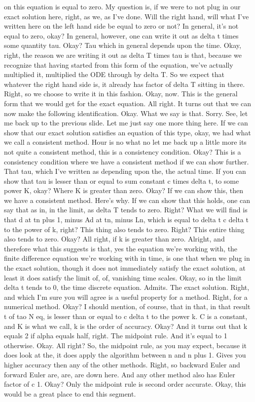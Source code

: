 \documentclass[10pt]{article}
\begin{document}
on this equation is equal to zero. My question is, if we were to not plug in our exact solution here, right, as we, as I've done. Will the right hand, will what I've written here on the left hand side be equal to zero or not? In general, it's not equal to zero, okay? In general, however, one can write it out as delta t times some quantity tau. Okay? Tau which in general depends upon the time. Okay, right, the reason we are writing it out as delta T times tau is that, because we recognize that having started from this form of the equation, we've actually multiplied it, multiplied the ODE through by delta T. So we expect that whatever the right hand side is, it already has factor of delta T sitting in there. Right, so we choose to write it in this fashion. Okay, now. This is the general form that we would get for the exact equation. All right. It turns out that we can now make the following identification. Okay. What we say is that. Sorry. See, let me back up to the previous slide. Let me just say one more thing here. If we can show that our exact solution satisfies an equation of this type, okay, we had what we call a consistent method. Hour is no what no let me back up a little more its not quite a consistent method, this is a consistency condition. Okay? This is a consistency condition where we have a consistent method if we can show further. That tau, which I've written as depending upon the, the actual time. If you can show that tau is lesser than or equal to sum constant c times delta t, to some power K, okay? Where K is greater than zero. Okay? If we can show this, then we have a consistent method. Here's why. If we can show that this holds, one can say that as in, in the limit, as delta T tends to zero. Right? What we will find is that d at tn plus 1, minus Ad at tn, minus Ln, which is equal to delta t c delta t to the power of k, right? This thing also tends to zero. Right? This entire thing also tends to zero. Okay? All right, if k is greater than zero. Alright, and therefore what this suggests is that, yes the equation we're working with, the finite difference equation we're working with in time, is one that when we plug in the exact solution, though it does not immediately satisfy the exact solution, at least it does satisfy the limit of, of, vanishing time scales. Okay, so in the limit delta t tends to 0, the time discrete equation. Admits. The exact solution. Right, and which I'm sure you will agree is a useful property for a method. Right, for a numerical method. Okay? I should mention, of course, that in that, in that result t of tao N eq, is lesser than or equal to c delta t to the power k. C is a constant, and K is what we call, k is the order of accuracy. Okay? And it turns out that k equals 2 if alpha equals half, right. The midpoint rule. And it's equal to 1 otherwise. Okay. All right? So, the midpoint rule, as you may expect, because it does look at the, it does apply the algorithm between n and n plus 1. Gives you higher accuracy then any of the other methods. Right, so backward Euler and forward Euler are, are, are down here. And any other method also has Euler factor of c 1. Okay? Only the midpoint rule is second order accurate. Okay, this would be a great place to end this segment.
\end{document}
